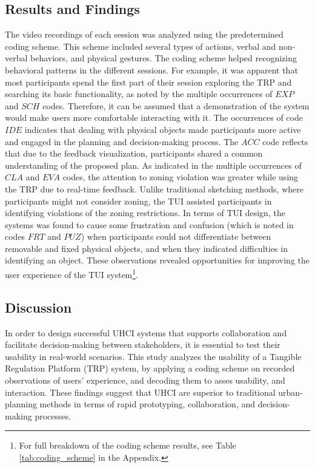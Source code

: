 {    \subsection{Results and Findings}

    {
        The video recordings of each session was analyzed using the predetermined coding scheme. This scheme included several types of actions, verbal and non-verbal behaviors, and physical gestures. The coding scheme helped recognizing behavioral patterns in the different sessions. For example, it was apparent that most participants spend the first part of their session exploring the TRP and searching its basic functionality, as noted by the multiple occurrences of $EXP$ and $SCH$ codes. Therefore, it can be assumed that a demonstration of the system would make users more comfortable interacting with it. The occurrences of code $IDE$ indicates that dealing with physical objects made participants more active and engaged in the planning and decision-making process. The $ACC$ code reflects that due to the feedback visualization, participants shared a common understanding of the proposed plan. As indicated in the multiple occurrences of $CLA$ and $EVA$ codes, the attention to zoning violation was greater while using the TRP due to real-time feedback. Unlike traditional sketching methods, where participants might not consider zoning, the TUI assisted participants in identifying violations of the zoning restrictions.
        \newline
        In terms of TUI design, the systems was found to cause some frustration and confusion (which is noted in codes $FRT$ and $PUZ$) when participants could not differentiate between removable and fixed physical objects, and when they indicated difficulties in identifying an object. These observations revealed opportunities for improving the user experience of the TUI system\footnote{For full breakdown of the coding scheme results, see Table \eqref{tab:coding_scheme} in the Appendix.}.
    }


    \subsection{Discussion}
    {
        In order to design successful UHCI systems that supports collaboration and facilitate decision-making between stakeholders, it is essential to test their usability in real-world scenarios.
        This study analyzes the usability of a Tangible Regulation Platform (TRP) system, by applying a coding scheme on recorded observations of users' experience, and decoding them to asses usability, and interaction. These findings suggest that UHCI are superior to traditional urban-planning methods in terms of rapid prototyping, collaboration, and decision-making processes.

}}
